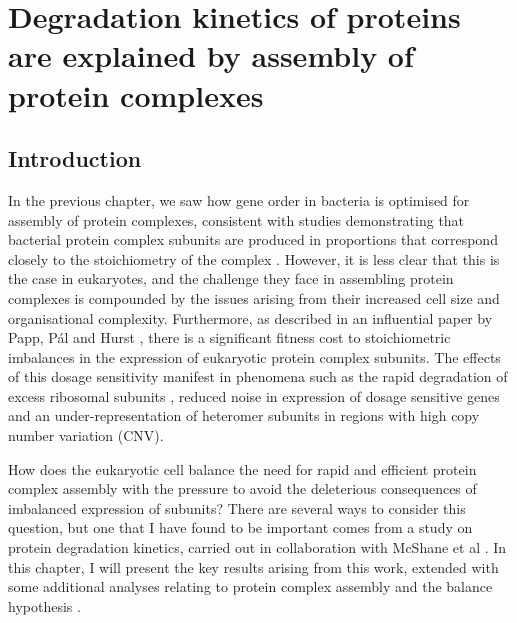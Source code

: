 \documentclass[a4paper,11pt,twoside,openright]{scrbook}
\begin{document}
\chapter{Degradation kinetics of proteins are explained by assembly of protein complexes} \label{chapter:degradation}

\section{Introduction}
In the previous chapter, we saw how gene order in bacteria is optimised for assembly of protein complexes, consistent with studies demonstrating that bacterial protein complex subunits are produced in proportions that correspond closely to the stoichiometry of the complex \cite{Li2014b,Burkhardt2017}. However, it is less clear that this is the case in eukaryotes, and the challenge they face in assembling protein complexes is compounded by the issues arising from their increased cell size and organisational complexity. Furthermore, as described in an influential paper by Papp, Pál and Hurst \cite{Papp2003}, there is a significant fitness cost to stoichiometric imbalances in the expression of eukaryotic protein complex subunits. The effects of this dosage sensitivity manifest in phenomena such as the rapid degradation of excess ribosomal subunits \cite{Warner1999,Sung2016}, reduced noise in expression of dosage sensitive genes \cite{Lehner2008} and an under-representation of heteromer subunits in regions with high copy number variation \cite{Schuster-Bockler2010} (CNV).

How does the eukaryotic cell balance the need for rapid and efficient protein complex assembly with the pressure to avoid the deleterious consequences of imbalanced expression of subunits? There are several ways to consider this question, but one that I have found to be important comes from a study on protein degradation kinetics, carried out in collaboration with McShane et al \cite{McShane2016}. In this chapter, I will present the key results arising from this work, extended with some additional analyses relating to protein complex assembly and the balance hypothesis \cite{Papp2003}.
\end{document}
